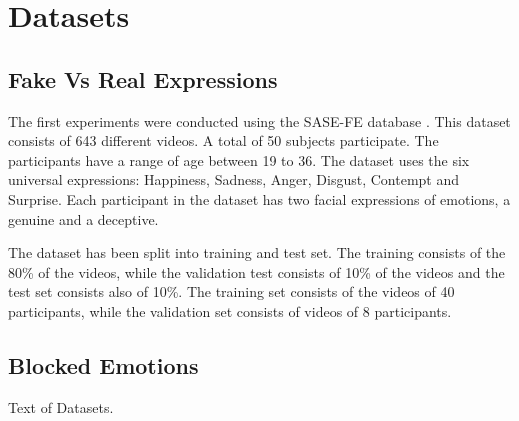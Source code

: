 \chapter{Datasets}
\label{ch:datasets}

\section{Fake Vs Real Expressions}

The first experiments were conducted using the SASE-FE database \cite{Ofodile2017AutomaticEmotion}. This dataset consists of 643 different videos. A total of 50 subjects participate. The participants have a range of age between 19 to 36. The dataset uses the six universal expressions: Happiness, Sadness, Anger, Disgust, Contempt and Surprise. Each participant in the dataset has two facial expressions of emotions, a genuine and a deceptive. 



The dataset has been split into training and test set. The training consists of the 80\% of the videos, while the validation test consists of 10\% of the videos and the test set consists also of 10\%. The training set consists of the videos of 40 participants, while the validation set consists of videos of 8 participants.



\section{Blocked Emotions}

Text of Datasets.